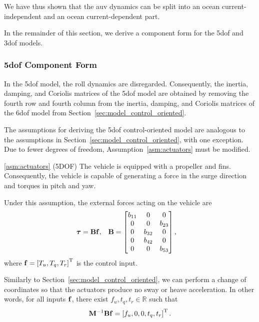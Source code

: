 We have thus shown that the \gls{auv} dynamics can be split into an ocean current-independent and an ocean current-dependent part.

In the remainder of this section, we derive a component form for the 5\gls{dof} and 3\gls{dof} models.

\subsubsection{5\gls{dof} Component Form}
In the 5\gls{dof} model, the roll dynamics are disregarded.
Consequently, the inertia, damping, and Coriolis matrices of the 5\gls{dof} model are obtained by removing the fourth row and fourth column from the inertia, damping, and Coriolis matrices of the 6\gls{dof} model from Section~\ref{sec:model_control_oriented}.

The assumptions for deriving the 5\gls{dof} control-oriented model are analogous to the assumptions in Section~\ref{sec:model_control_oriented}, with one exception.
Due to fewer degrees of freedom, Assumption~\ref{asm:actuators} must be modified.

\begin{customasm}{\ref*{asm:actuators} (5DOF)}
    \label{asm:actuators_5DOF}
    The vehicle is equipped with a propeller and fins.
    Consequently, the vehicle is capable of generating a force in the surge direction and torques in pitch and yaw.
\end{customasm}
Under this assumption, the external forces acting on the vehicle are
\begin{align}
    \bm{\tau} &= \mathbf{B}\mathbf{f}, &
    \mathbf{B} &= 
    \begin{bmatrix}
        b_{11} & 0 & 0 \\ 0 & 0 & b_{23} \\ 0 & b_{32} & 0 \\ 0 & b_{42} & 0 \\ 0 & 0 & b_{53}
    \end{bmatrix},
\end{align}
where $\mathbf{f} = \left[T_u, T_q, T_r\right]^{\mathrm{T}}$ is the control input.

Similarly to Section~\ref{sec:model_control_oriented}, we can perform a change of coordinates so that the actuators produce no sway or heave acceleration.
In other words, for all inputs $\mathbf{f}$, there exist $f_u, t_q, t_r \in \mathbb{R}$ such that
\begin{equation}
    \mathbf{M}^{-1}\mathbf{B}\mathbf{f} = \left[f_u, 0, 0, t_q, t_r\right]^{\mathrm{T}}.
\end{equation}

